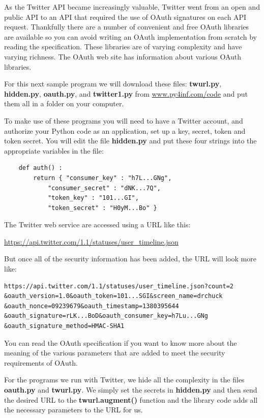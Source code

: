 \documentclass[11pt]{book}
\begin{document}
As the Twitter API became increasingly valuable, Twitter
went from an open and public API to an API that required
the use of OAuth signatures on each API request. Thankfully
there are a number of convenient and free OAuth libraries
are available 
so you can avoid writing an OAuth implementation from scratch
by reading the specification.  These libraries are of 
varying complexity and have varying 
richness.  The OAuth web site has information about various 
OAuth libraries.

For this next sample program we will download these files: 
{\bf twurl.py}, {\bf hidden.py}, 
{\bf oauth.py}, 
and
{\bf twitter1.py} from 
\url{www.py4inf.com/code} and put them all in a folder
on your computer.

To make use of these programs you will need to have a Twitter
account, and authorize your Python code as an application,
set up a key, secret, token and token secret.  You will edit
the file {\bf hidden.py} and put these four strings into the
appropriate variables in the file:

\beforeverb
\begin{verbatim}
    def auth() :
        return { "consumer_key" : "h7L...GNg",
            "consumer_secret" : "dNK...7Q",
            "token_key" : "101...GI",
            "token_secret" : "H0yM...Bo" }
\end{verbatim}
\afterverb
%
The Twitter web service are accessed using a URL like this:

\url{https://api.twitter.com/1.1/statuses/user_timeline.json}

But once all of the security information has been added, the URL
will look more like:

\beforeverb
\begin{verbatim}
https://api.twitter.com/1.1/statuses/user_timeline.json?count=2
&oauth_version=1.0&oauth_token=101...SGI&screen_name=drchuck
&oauth_nonce=09239679&oauth_timestamp=1380395644
&oauth_signature=rLK...BoD&oauth_consumer_key=h7Lu...GNg
&oauth_signature_method=HMAC-SHA1
\end{verbatim}
\afterverb
%
You can read the OAuth specification if you want to
know more about the meaning of the various parameters that
are added to meet the security requirements of OAuth.  

For the programs we run with Twitter, we hide all the 
complexity in the files {\bf oauth.py} and {\bf twurl.py}.
We simply set the secrets in {\bf hidden.py} and then 
send the desired URL to the {\bf twurl.augment()} 
function and the library code adds all the necessary 
parameters to the URL for us.
\end{document}
